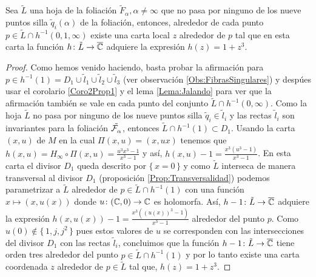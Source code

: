\begin{Lema}
\label{Lema:ExpresionLocalDeLaAplicacionCubriente}
Sea $\tilde{L}$ una hoja de la foliación $\tilde{F}_{\alpha}, \alpha\neq\infty$ que no pasa por ninguno de los nueve puntos silla $\tilde{q}_{i}(\alpha)$ de la foliación, entonces, alrededor de cada punto $p\in\tilde{L}\cap h^{-1}(0,1,\infty)$ existe una carta local $z$ alrededor de $p$ tal que en esta carta la función $h\colon \tilde{L}\rightarrow\overline{\mathbb{C}}$ adquiere la expresión $h(z)=1+z^{3}$.
\end{Lema}

\begin{proof}
Como hemos venido haciendo, basta probar la afirmación para $p\in h^{-1}(1)=D_{1}\cup\tilde{l}_{1}\cup\tilde{l}_{2}\cup\tilde{l}_{3}$ (ver observación \ref{Obs:FibrasSingulares}) y despúes usar el corolario \ref{Coro2Prop1} y el lema \ref{Lema:Jalando} para ver que la afirmación también se vale en cada punto del conjunto $\tilde{L}\cap h^{-1}(0,\infty)$. Como la hoja $\tilde{L}$ no pasa por ninguno de los nueve puntos silla $\tilde{q}_{i}\in\tilde{l}_{i}$ y las rectas $\tilde{l}_{i}$ son invariantes para la foliación $\tilde{\mathcal{F}^{\ }_{\alpha}}$, entonces $\tilde{L}\cap h^{-1}(1)\subset D_{1}$. Usando la carta $(x,u)$ de $M$ en la cual $\Pi(x,u)=(x,ux)$ tenemos que $h(x,u)=H_{\infty}\circ\Pi(x,u)=\tfrac{u^{3}x^{3}-1}{x^{3}-1}$ y así, $h(x,u)-1=\tfrac{x^{3}(u^{3}-1)}{x^{3}-1}$. En esta carta el divisor $D_{1}$ queda descrito por $\{\, x=0\, \}$ y como $\tilde{L}$ interseca de manera transversal al divisor $D_{1}$ (proposición \ref{Prop:Transversalidad}) podemos parametrizar a $\tilde{L}$ alrededor de $p\in\tilde{L}\cap h^{-1}(1)$ con una función $x\mapsto (x,u(x))$ donde $u\colon (\mathbb{C},0)\rightarrow\mathbb{C}$ es holomorfa. Así, $h-1\colon \tilde{L}\rightarrow\overline{\mathbb{C}}$ adquiere la expresión $h(x,u(x))-1=\tfrac{x^{3}((u(x))^{3}-1)}{x^{3}-1}$ alrededor del punto $p$. Como $u(0)\notin\{\, 1,j,j^{2}\, \}$ pues estos valores de $u$ se corresponden con las intersecciones del divisor $D_{1}$ con las rectas $\tilde{l}_{i}$, concluimos que la función $h-1\colon \tilde{L}\rightarrow\overline{\mathbb{C}}$ tiene orden tres alrededor del punto $p\in\tilde{L}\cap h^{-1}(1)$ y por lo tanto existe una carta coordenada $z$ alrededor de $p\in\tilde{L}$ tal que, $h(z)=1+z^{3}$. 
\end{proof}

